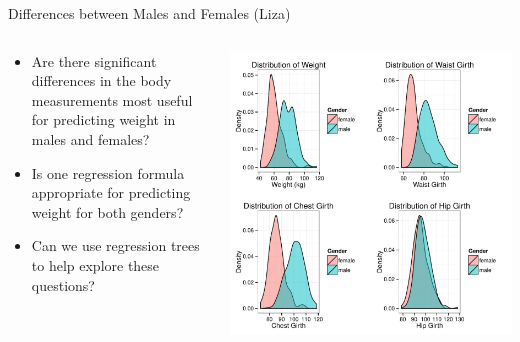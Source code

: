 \documentclass[table]{beamer}\usepackage[]{graphicx}\usepackage[]{color}
\makeatletter
\def\maxwidth{ %
  \ifdim\Gin@nat@width>\linewidth
    \linewidth
  \else
    \Gin@nat@width
  \fi
}
\newenvironment{knitrout}{}{} %
\makeatother
\begin{document}
\begin{frame}{Differences between Males and Females (Liza)}
    \begin{columns}[t] %
     \begin{column}[T]{5cm} %
   
\begin{itemize}
  \item Are there significant differences in the body measurements most useful for predicting weight in males and females?
  \item Is one regression formula appropriate for predicting weight for both genders?
  \item Can we use regression trees to help explore these questions?
\end{itemize}

\end{column}
\begin{column}[T]{7cm} %


\begin{knitrout}
\color{fgcolor}
\includegraphics[width=\maxwidth]{figure/gender_plots} 

\end{knitrout}


     \end{column}
     \end{columns}
\end{frame}
\end{document}
